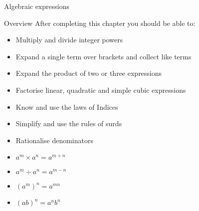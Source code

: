 \documentclass[fleqn]{article}
\newcommand{\bookletunittitle}{Algebraic expressions}               %
\begin{document}
\newpage
\pagestyle{branded}
\setcounter{page}{1}




\begin{minipage}[t]{.85\textwidth}
        \sffamily{}
        \bfseries\YUGE\raggedright\bookletunittitle\\
\end{minipage}
\begin{minipage}[t]{.15\textwidth}
        \sffamily
        \bfseries\YUGE\raggedleft{}
\end{minipage}

\begin{mybox2}[colbacktitle=green]{Overview}
    After completing this chapter you should be able to:
    \begin{itemize}
        \item Multiply and divide integer powers
        \item Expand a single term over brackets and collect like terms
        \item Expand the product of two or three expressions
        \item Factorise linear, quadratic and simple cubic expressions
        \item Know and use the laws of Indices
        \item Simplify and use the rules of surds
        \item Rationalise denominators
    \end{itemize}
\end{mybox2}




\begin{itemize}
    \item $a^m \times a^n = a^{m+n}$
    \item $a^m \div a^n = a^{m-n}$
    \item $(a^m)^n = a^{mn}$
    \item $(ab)^n = a^nb^n$
\end{itemize}
\end{document}
